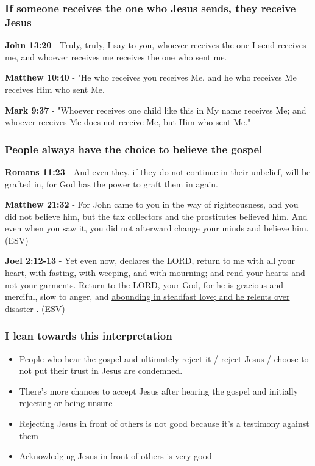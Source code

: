 \documentclass[11pt]{article}
\begin{document}
\subsubsection{If someone receives the one who Jesus sends, they receive Jesus}
\label{sec:orgcae3445}
\textbf{John 13:20} - Truly, truly, I say to you, whoever receives the one I send receives me, and whoever receives me receives the one who sent me.

\textbf{Matthew 10:40} - "He who receives you receives Me, and he who receives Me receives Him who sent Me.

\textbf{Mark 9:37} - "Whoever receives one child like this in My name receives Me; and whoever receives Me does not receive Me, but Him who sent Me."

\subsubsection{People always have the choice to believe the gospel}
\label{sec:org7406bb6}
\textbf{Romans 11:23} - And even they, if they do not continue in their unbelief, will be grafted in, for God has the power to graft them in again.

\textbf{Matthew 21:32} - For John came to you in the way of righteousness, and you did not believe him, but the tax collectors and the prostitutes believed him. And even when you saw it, you did not afterward change your minds and believe him. (ESV)

\textbf{Joel 2:12-13} - Yet even now, declares the LORD, return to me with all your heart, with fasting, with weeping, and with mourning; and rend your hearts and not your garments. Return to the LORD, your God, for he is gracious and merciful, slow to anger, and \uline{abounding in steadfast love; and he relents over disaster} . (ESV)

\subsubsection{I lean towards this interpretation}
\label{sec:org505f978}
\begin{itemize}
\item People who hear the gospel and \uline{ultimately} reject it / reject Jesus / choose to not put their trust in Jesus are condemned.
\item There's more chances to accept Jesus after hearing the gospel and initially rejecting or being unsure
\item Rejecting Jesus in front of others is not good because it's a testimony against them
\item Acknowledging Jesus in front of others is very good
\end{itemize}
\end{document}
